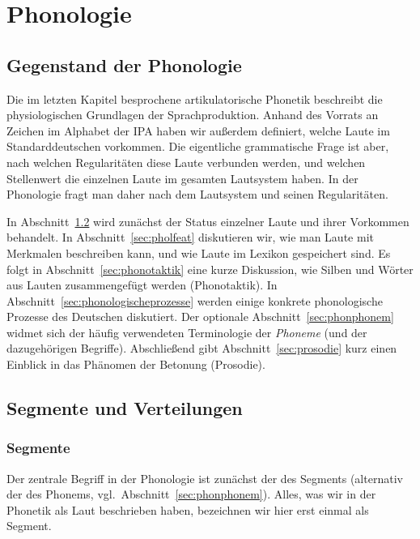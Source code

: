 \chapter{Phonologie}

\label{sec:phonologie}

\section{Gegenstand der Phonologie}

Die im letzten Kapitel besprochene artikulatorische Phonetik beschreibt die physiologischen Grundlagen der Sprachproduktion.
Anhand des Vorrats an Zeichen im Alphabet der IPA haben wir außerdem definiert, welche Laute im Standarddeutschen vorkommen.
Die eigentliche grammatische Frage ist aber, nach welchen Regularitäten diese Laute verbunden werden, und welchen Stellenwert die einzelnen Laute im gesamten Lautsystem haben.
In der Phonologie fragt man daher nach dem Lautsystem und seinen Regularitäten.

In Abschnitt~\ref{sec:segmenteverteilungen} wird zunächst der Status einzelner Laute und ihrer Vorkommen behandelt.
In Abschnitt~\ref{sec:pholfeat} diskutieren wir, wie man Laute mit Merkmalen beschreiben kann, und wie Laute im Lexikon gespeichert sind.
Es folgt in Abschnitt~\ref{sec:phonotaktik} eine kurze Diskussion, wie Silben und Wörter aus Lauten zusammengefügt werden (Phonotaktik).
In Abschnitt~\ref{sec:phonologischeprozesse} werden einige konkrete phonologische Prozesse des Deutschen diskutiert.
Der optionale Abschnitt~\ref{sec:phonphonem} widmet sich der häufig verwendeten Terminologie der \textit{Phoneme} (und der dazugehörigen Begriffe).
Abschließend gibt Abschnitt~\ref{sec:prosodie} kurz einen Einblick in das Phänomen der Betonung (Prosodie).

\section{Segmente und Verteilungen}

\label{sec:segmenteverteilungen}

\subsection{Segmente}

Der zentrale Begriff in der Phonologie ist zunächst der des Segments (alternativ der des Phonems, vgl.\ Abschnitt~\ref{sec:phonphonem}).
Alles, was wir in der Phonetik als Laut beschrieben haben, bezeichnen wir hier erst einmal als Segment.

